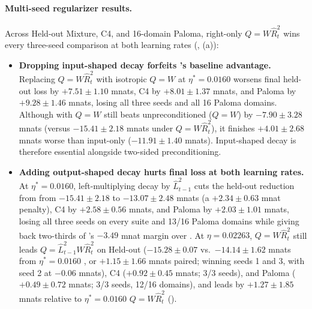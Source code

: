 \paragraph{Multi-seed regularizer results.}
Across Held-out Mixture, C4, and 16-domain Paloma, right-only $Q=W\hat R_t^2$ wins every three-seed comparison at both learning rates (, (a)):
\begin{itemize}
 \item \textbf{Dropping input-shaped decay forfeits 's baseline advantage.} Replacing $Q=W\hat R_t^2$ with isotropic $Q=W$ at $\eta^*=0.0160$ worsens final held-out loss by $+7.51\pm1.10$ mnats, C4 by $+8.01\pm1.37$ mnats, and Paloma by $+9.28\pm1.46$ mnats, losing all three seeds and all 16 Paloma domains. Although  with $Q=W$ still beats unpreconditioned  ($Q=W$) by $-7.90\pm3.28$ mnats (versus $-15.41\pm2.18$ mnats under $Q=W\hat R_t^2$), it finishes $+4.01\pm2.68$ mnats worse than input-only  ($-11.91\pm1.40$ mnats). Input-shaped decay is therefore essential alongside two-sided preconditioning.
 \item \textbf{Adding output-shaped decay hurts final loss at both learning rates.} At $\eta^*=0.0160$, left-multiplying decay by $\hat L_{t-1}^2$ cuts the held-out reduction from  from $-15.41\pm2.18$ to $-13.07\pm2.48$ mnats (a $+2.34\pm0.63$ mnat penalty), C4 by $+2.58\pm0.56$ mnats, and Paloma by $+2.03\pm1.01$ mnats, losing all three seeds on every suite and 13/16 Paloma domains while giving back two-thirds of 's $-3.49$ mnat margin over . At $\eta=0.02263$, $Q=W\hat R_t^2$ still leads $Q=\hat L_{t-1}^2 W\hat R_t^2$ on Held-out ($-15.28\pm0.07$ vs.\ $-14.14\pm1.62$ mnats from $\eta^*=0.0160$ , or $+1.15\pm1.66$ mnats paired; winning seeds 1 and 3, with seed 2 at $-0.06$ mnats), C4 ($+0.92\pm0.45$ mnats; 3/3 seeds), and Paloma ($+0.49\pm0.72$ mnats; 3/3 seeds, 12/16 domains), and leads by $+1.27\pm1.85$ mnats relative to $\eta^*=0.0160$ $Q=W\hat R_t^2$ ().

\end{itemize}
